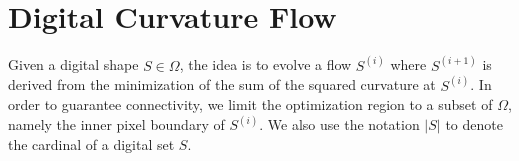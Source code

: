 \documentclass[runningheads]{llncs}
\begin{document}
\section{Digital Curvature Flow}

%	
%
%		
%
%
%

%





Given a digital shape $S \in \Omega$, the idea is to evolve a flow $S^{(i)}$ where $S^{(i+1)}$ is derived from the minimization of the sum of the squared curvature at $S^{(i)}$. In order to guarantee connectivity, we limit the optimization region to a subset of $\Omega$, namely the inner pixel boundary of  $S^{(i)}$. We also use the notation $| S |$ to denote the cardinal of a digital set $S$.
\end{document}
